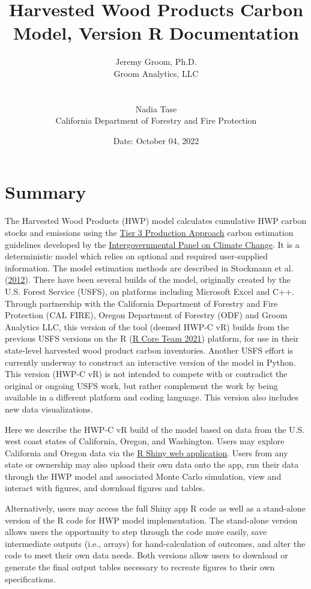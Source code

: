 \documentclass[
  openany]{book}
\title{Harvested Wood Products Carbon Model, Version R Documentation}
\author{Jeremy Groom, Ph.D.\\
Groom Analytics, LLC\\
\strut \\
Nadia Tase\\
California Department of Forestry and Fire Protection}
\date{Date: October 04, 2022}
\begin{document}
\frontmatter
\maketitle

\mainmatter
\hypertarget{sum}{%
\chapter{Summary}\label{sum}}

The Harvested Wood Products (HWP) model calculates cumulative HWP carbon
stocks and emissions using the
\href{https://www.ipcc-nggip.iges.or.jp/public/2006gl/pdf/4_Volume4/V4_04_Ch4_Forest_Land.pdf}{Tier
3 Production Approach} carbon estimation guidelines developed by the
\href{https://www.ipcc.ch/}{Intergovernmental Panel on Climate Change}.
It is a deterministic model which relies on optional and required
user-supplied information. The model estimation methods are described in
Stockmann et al. (\protect\hyperlink{ref-stockmann2012}{2012}). There
have been several builds of the model, originally created by the U.S.
Forest Service (USFS), on platforms including Microsoft Excel and C++.
Through partnership with the California Department of Forestry and Fire
Protection (CAL FIRE), Oregon Department of Forestry (ODF) and Groom
Analytics LLC, this version of the tool (deemed HWP-C vR) builds from
the previous USFS versions on the R (\protect\hyperlink{ref-R-base}{R
Core Team 2021}) platform, for use in their state-level harvested wood
product carbon inventories. Another USFS effort is currently underway to
construct an interactive version of the model in Python. This version
(HWP-C vR) is not intended to compete with or contradict the original or
ongoing USFS work, but rather complement the work by being available in
a different platform and coding language. This version also includes new
data visualizations.

Here we describe the HWP-C vR build of the model based on data from the
U.S. west coast states of California, Oregon, and Washington. Users may
explore California and Oregon data via the
\href{https://groomanalyticsllc.shinyapps.io/HWP-C-vR/}{R Shiny web
application}. Users from any state or ownership may also upload their
own data onto the app, run their data through the HWP model and
associated Monte Carlo simulation, view and interact with figures, and
download figures and tables.

Alternatively, users may access the full Shiny app R code as well as a
stand-alone version of the R code for HWP model implementation. The
stand-alone version allows users the opportunity to step through the
code more easily, save intermediate outputs (i.e., arrays) for
hand-calculation of outcomes, and alter the code to meet their own data
needs. Both versions allow users to download or generate the final
output tables necessary to recreate figures to their own specifications.
\end{document}
